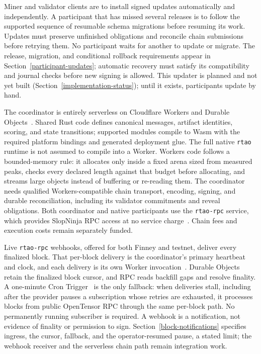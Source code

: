 Miner and validator clients are to install signed updates automatically and
independently. A participant that has missed several releases is to follow the
supported sequence of resumable schema migrations before resuming its work.
Updates must preserve unfinished obligations and reconcile chain submissions
before retrying them. No participant waits for another to update or migrate. The
release, migration, and conditional rollback requirements appear in
Section~\ref{participant-updates}; automatic recovery must satisfy its
compatibility and journal checks before new signing is allowed. This updater is
planned and not yet built (Section~\ref{implementation-status}); until it
exists, participants update by hand.

The coordinator is entirely serverless on Cloudflare Workers and Durable
Objects~\cite{cfworkers,cfdo}. Shared Rust code defines canonical messages,
artifact identities, scoring, and state transitions; supported modules compile
to Wasm with the required platform bindings and generated deployment glue.
The full native \texttt{rtao} runtime is not assumed to compile into a Worker.
Workers code follows a bounded-memory rule: it allocates only inside a fixed
arena sized from measured peaks, checks every declared length against that
budget before allocating, and streams large objects instead of buffering or
re-reading them.
The coordinator needs qualified Workers-compatible chain transport, encoding,
signing, and durable reconciliation, including its validator commitments and
reveal obligations. Both coordinator and native participants use the
\texttt{rtao-rpc} service, which provides SlopNinja RPC
access at no service charge~\cite{rtaorpc}. Chain fees and execution costs remain
separately funded.

Live \texttt{rtao-rpc} webhooks, offered for both Finney and testnet, deliver
every finalized block. That per-block delivery is the coordinator's primary
heartbeat and clock, and each delivery is its own Worker invocation~\cite{cffetch}.
Durable Objects retain the finalized block cursor, and RPC reads backfill gaps
and resolve finality. A one-minute Cron Trigger~\cite{cfcron} is the only
fallback: when deliveries stall, including after the provider pauses a
subscription whose retries are exhausted, it processes blocks from public
OpenTensor RPC through the same per-block path. No permanently running
subscriber is required. A webhook is a notification, not evidence of finality or
permission to sign. Section~\ref{block-notifications} specifies ingress, the
cursor, fallback, and the operator-resumed pause, a stated limit; the webhook
receiver and the serverless chain path remain integration work.

